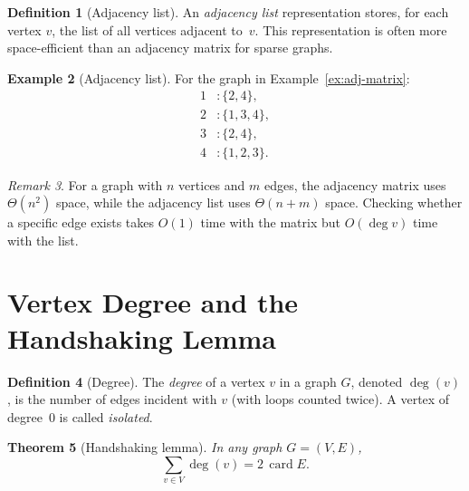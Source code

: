 \documentclass[12pt,a4paper,openany]{book}
\theoremstyle{definition}
\newtheorem{definition}{Definition}[chapter]
\newtheorem{example}[definition]{Example}
\theoremstyle{plain}
\newtheorem{theorem}[definition]{Theorem}
\theoremstyle{remark}
\newtheorem{remark}[definition]{Remark}
\DeclareMathOperator{\card}{card}
\begin{document}
\begin{definition}[Adjacency list]\label{def:adj-list}
An \emph{adjacency list} representation stores, for each vertex $v$, the
list of all vertices adjacent to~$v$.  This representation is often more
space-efficient than an adjacency matrix for sparse graphs.
\end{definition}

\begin{example}[Adjacency list]\label{ex:adj-list}
For the graph in Example~\ref{ex:adj-matrix}:
\[
\begin{aligned}
   1 &: \{2, 4\}, \\
   2 &: \{1, 3, 4\}, \\
   3 &: \{2, 4\}, \\
   4 &: \{1, 2, 3\}.
\end{aligned}
\]
\end{example}

\begin{remark}\label{rem:representation-complexity}
For a graph with $n$ vertices and $m$ edges, the adjacency matrix
uses $\Theta(n^2)$ space, while the adjacency list uses $\Theta(n + m)$
space.  Checking whether a specific edge exists takes $O(1)$ time with
the matrix but $O(\deg v)$ time with the list.
\end{remark}

\section{Vertex Degree and the Handshaking Lemma}\label{sec:degree}

\begin{definition}[Degree]\label{def:degree}
The \emph{degree} of a vertex $v$ in a graph $G$, denoted $\deg(v)$, is
the number of edges incident with $v$ (with loops counted twice).  A
vertex of degree~$0$ is called \emph{isolated}.
\end{definition}

\begin{theorem}[Handshaking lemma]\label{thm:handshaking}
In any graph $G = (V, E)$,
\begin{equation}\label{eq:handshaking}
   \sum_{v \in V} \deg(v) = 2\, \card{E}.
\end{equation}
\end{theorem}
\end{document}
